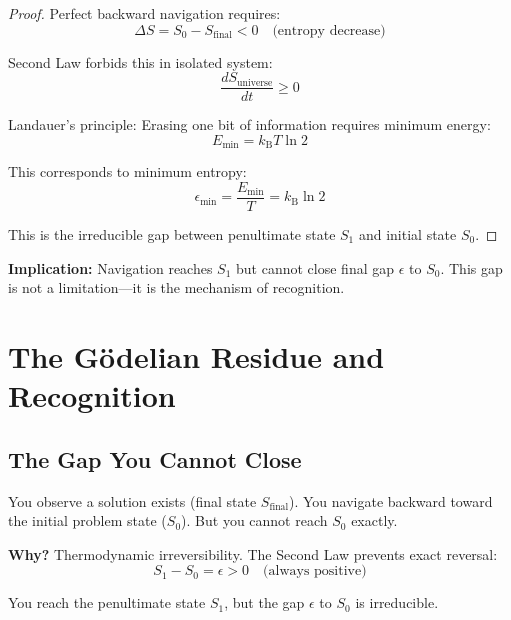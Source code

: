 \documentclass[twocolumn,10pt]{article}
\theoremstyle{definition}
\theoremstyle{remark}
\newcommand{\kB}{k_{\text{B}}}
\begin{document}
\begin{proof}
Perfect backward navigation requires:
\begin{equation}
\Delta S = S_0 - S_{\text{final}} < 0 \quad \text{(entropy decrease)}
\end{equation}

Second Law forbids this in isolated system:
\begin{equation}
\frac{dS_{\text{universe}}}{dt} \geq 0
\end{equation}

Landauer's principle: Erasing one bit of information requires minimum energy:
\begin{equation}
E_{\min} = \kB T \ln 2
\end{equation}

This corresponds to minimum entropy:
\begin{equation}
\epsilon_{\min} = \frac{E_{\min}}{T} = \kB \ln 2
\end{equation}

This is the irreducible gap between penultimate state $S_1$ and initial state $S_0$.
\end{proof}

\vspace{0.2cm}
\noindent\textbf{Implication:} Navigation reaches $S_1$ but cannot close final gap $\epsilon$ to $S_0$. This gap is not a limitation—it is the mechanism of recognition.

\section{The Gödelian Residue and Recognition}
\label{sec:residue}

\subsection{The Gap You Cannot Close}

You observe a solution exists (final state $S_{\text{final}}$). You navigate backward toward the initial problem state ($S_0$). But you cannot reach $S_0$ exactly.

\vspace{0.2cm}
\noindent\textbf{Why?} Thermodynamic irreversibility. The Second Law prevents exact reversal:
\begin{equation}
S_1 - S_0 = \epsilon > 0 \quad \text{(always positive)}
\end{equation}

You reach the penultimate state $S_1$, but the gap $\epsilon$ to $S_0$ is irreducible.
\end{document}
